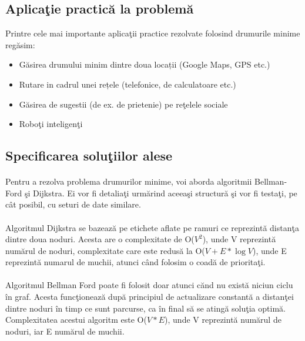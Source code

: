 \documentclass[runningheads]{llncs}
\begin{document}
\subsection{Aplica\c{t}ie practic\u{a} la problem\u{a}}
Printre cele mai importante aplica\c{t}ii practice rezolvate folosind drumurile minime reg\u{a}sim:
\begin{itemize}
	\item Găsirea drumului minim dintre doua locații (Google Maps, GPS etc.)
	\item Rutare in cadrul unei rețele (telefonice, de calculatoare etc.)
	\item G\u{a}sirea de sugestii (de ex. de prietenie) pe re\c{t}elele sociale
	\item Robo\c{t}i inteligen\c{t}i
\end{itemize}

\subsection{Specificarea solu\c{t}iilor alese}
\paragraph{}Pentru a rezolva problema drumurilor minime, voi aborda algoritmii Bellman-Ford \c{s}i Dijkstra. Ei vor fi detalia\c{t}i urm\u{a}rind aceea\c{s}i structur\u{a} \c{s}i vor fi testa\c{t}i, pe c\^{a}t posibil, cu seturi de date similare.
\paragraph{}Algoritmul Dijkstra se bazeaz\u{a} pe etichete aflate pe ramuri ce reprezint\u{a} distan\c{t}a dintre doua noduri. Acesta are o complexitate de O($V^2$),  unde V reprezint\u{a} num\u{a}rul de noduri, complexitate care este redus\u{a} la O($V + E * \log{V}$), unde E reprezint\u{a} numarul de muchii, atunci c\^{a}nd folosim o coad\u{a} de priorita\c{t}i.

\paragraph{}Algoritmul Bellman Ford poate fi folosit doar atunci c\u{a}nd nu exist\u{a} niciun ciclu \^{i}n graf. Acesta func\c{t}ioneaz\u{a} dup\u{a} principiul de actualizare constant\u{a} a distan\c{t}ei dintre noduri \^{i}n timp ce sunt parcurse, ca \^{i}n final s\u{a} se ating\u{a} solu\c{t}ia optim\u{a}. Complexitatea acestui algoritm este O($V*E$), unde V reprezint\u{a} num\u{a}rul de noduri, iar E num\u{a}rul de muchii.
\end{document}
